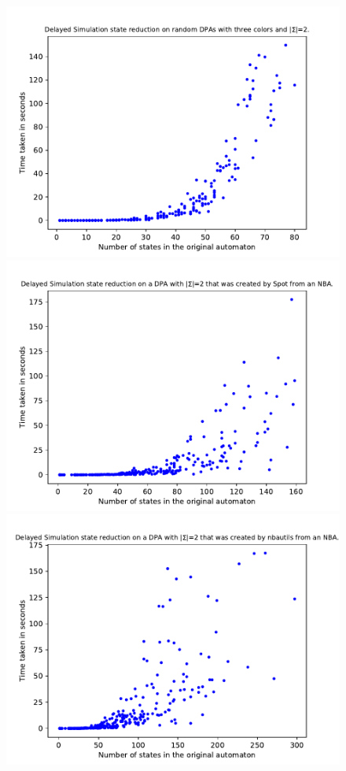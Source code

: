\begin{figure}
	\centering
	\begin{minipage}{0.49\textwidth}
		\includegraphics[page=1,height=.3\textheight]{../data/analysis/fritzwilke/gendet_ap1.pdf} 
		\includegraphics[page=1,height=.3\textheight]{../data/analysis/fritzwilke/detspot_ap1.pdf} 
		\includegraphics[page=1,height=.3\textheight]{../data/analysis/fritzwilke/detnbaut_ap1.pdf} 

\end{minipage}
\end{figure}
